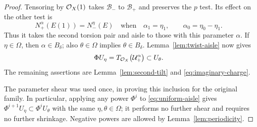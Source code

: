 \begin{proof}
Tensoring by $\mathcal O_X(1)$ takes $\mathcal B_-$ to $\mathcal B_+$
and preserves the $p$ test.  Its effect on the other test is
\[
 N_+^\alpha(E(1))=N_-^\eta(E)
 \quad\text{when}\quad
             \alpha_1=\eta_1,\qquad\alpha_0=\eta_0-\eta_1.
\]
Thus it takes the second torsion pair and aisle to those with this
parameter $\alpha$.  If $\eta\in\Omega$, then $\alpha\in B_\delta$;
also $\theta\in\Omega$ implies $\theta\in B_\delta$.
Lemma~\ref{lem:twist-aisle} now gives
\[
 \Phi U_\eta=T_{\mathcal O_X}\bigl(\mathcal U_+^\alpha\bigr)
                                      \subset U_\theta.
\]
The remaining assertions are Lemma~\ref{lem:second-tilt} and
\eqref{eq:imaginary-charge}.

The parameter shear was used once, in proving this inclusion for
the original family.  In particular, applying any power $\Phi^i$
to \eqref{eq:uniform-aisle} gives
$\Phi^{i+1}U_\eta\subset\Phi^iU_\theta$ with the same
$\eta,\theta\in\Omega$; it performs no further shear and requires
no further shrinkage.  Negative powers are allowed by
Lemma~\ref{lem:periodicity}.
\end{proof}
